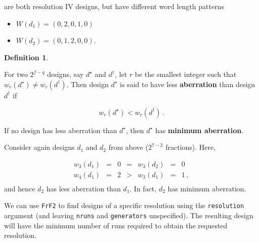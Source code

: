 \documentclass[
]{book}
\newenvironment{Shaded}{\begin{snugshade}}{\end{snugshade}}
\newcommand{\AttributeTok}[1]{\textcolor[rgb]{0.77,0.63,0.00}{#1}}
\newcommand{\DecValTok}[1]{\textcolor[rgb]{0.00,0.00,0.81}{#1}}
\newcommand{\FloatTok}[1]{\textcolor[rgb]{0.00,0.00,0.81}{#1}}
\newcommand{\FunctionTok}[1]{\textcolor[rgb]{0.00,0.00,0.00}{#1}}
\newcommand{\NormalTok}[1]{#1}
\newcommand{\OtherTok}[1]{\textcolor[rgb]{0.56,0.35,0.01}{#1}}
\newcommand{\SpecialCharTok}[1]{\textcolor[rgb]{0.00,0.00,0.00}{#1}}
\providecommand{\tightlist}{%
  \setlength{\itemsep}{0pt}\setlength{\parskip}{0pt}}
\theoremstyle{definition}
\newtheorem{definition}{Definition}[chapter]
\theoremstyle{definition}
\theoremstyle{definition}
\theoremstyle{definition}
\theoremstyle{remark}
\begin{document}
are both resolution IV designs, but have different word length patterns

\begin{itemize}
\tightlist
\item
  \(W(d_1) = (0, 2, 0, 1, 0)\)
\item
  \(W(d_2) = (0, 1, 2, 0, 0)\).
\end{itemize}

\begin{definition}
\protect\hypertarget{def:minab}{}\label{def:minab}

For two \(2^{f-q}\) designs, say \(d^\star\) and \(d^\dagger\), let \(r\) be the smallest integer such that \(w_r(d^\star) \ne w_r(d^\dagger)\). Then design \(d^\star\) is said to have less \textbf{aberration} than design \(d^\dagger\) if

\[
w_r(d^\star) < w_r(d^\dagger)\,.
\]

If no design has less aberration than \(d^\star\), then \(d^\star\) has \textbf{minimum aberration}.

\end{definition}

Consider again designs \(d_1\) and \(d_2\) from above (\(2^{7-2}\) fractions). Here,

\[
\begin{array}{ccccccc}
w_3(d_1) & = & 0 & = & w_3(d_2) & = & 0 \\
w_4(d_1) & = & 2 & > & w_3(d_1) & = & 1 \,, \\
\end{array}
\]
and hence \(d_2\) has less aberration than \(d_1\). In fact, \(d_2\) has minimum aberration.

We can use \texttt{FrF2} to find designs of a specific resolution using the \texttt{resolution} argument (and leaving \texttt{nruns} and \texttt{generators} unspecified). The resulting design will have the minimum number of runs required to obtain the requested resolution.

\begin{Shaded}
\end{Shaded}
\end{document}
